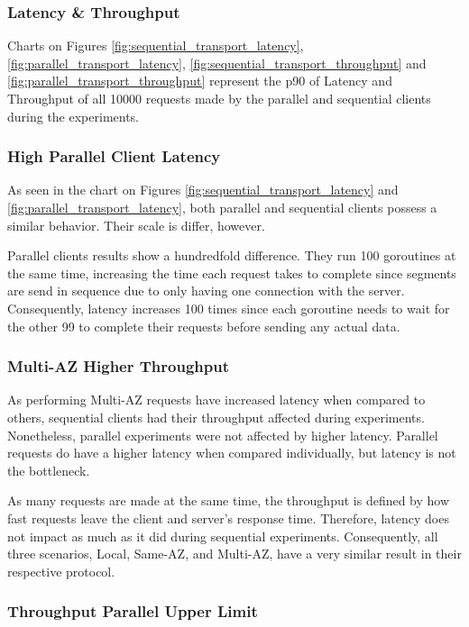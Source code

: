 \subsubsection{Latency \& Throughput}

Charts on Figures \ref{fig:sequential_transport_latency}, \ref{fig:parallel_transport_latency}, \ref{fig:sequential_transport_throughput} and \ref{fig:parallel_transport_throughput} represent the \gls{p90} of Latency and Throughput of all 10000 requests made by the parallel and sequential clients during the experiments.

\subsubsection*{High Parallel Client Latency}

As seen in the chart on Figures \ref{fig:sequential_transport_latency} and \ref{fig:parallel_transport_latency}, both parallel and sequential clients possess a similar behavior. Their scale is differ, however. 

Parallel clients results show a hundredfold difference. They run 100 goroutines at the same time, increasing the time each request takes to complete since segments are send in sequence due to only having one connection with the server. Consequently, latency increases 100 times since each goroutine needs to wait for the other 99 to complete their requests before sending any actual data.

\subsubsection*{Multi-AZ Higher Throughput}

As performing Multi-AZ requests have increased latency when compared to others, sequential clients had their throughput affected during experiments. Nonetheless, parallel experiments were not affected by higher latency. Parallel requests do have a higher latency when compared individually, but latency is not the bottleneck.

As many requests are made at the same time, the throughput is defined by how fast requests leave the client and server's response time. Therefore, latency does not impact as much as it did during sequential experiments. Consequently, all three scenarios, Local, Same-AZ, and Multi-AZ, have a very similar result in their respective protocol.

\subsubsection*{Throughput Parallel Upper Limit}

